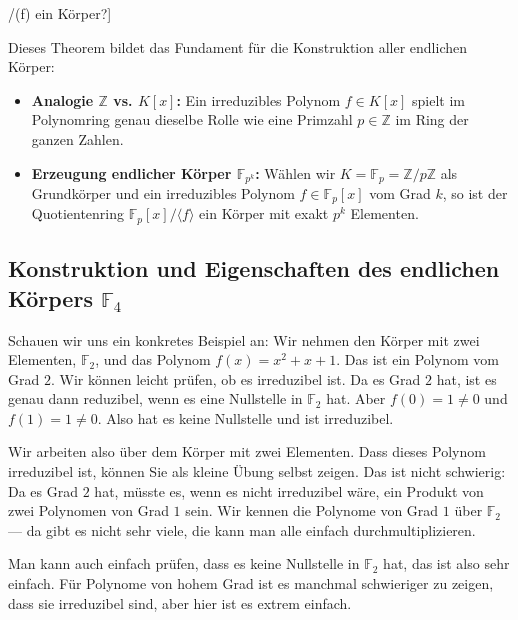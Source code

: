 \begin{math-stroke}[Wann ist K[x]/(f) ein Körper?]
\begin{explanation-of-steps}
Dieses Theorem bildet das Fundament für die Konstruktion aller endlichen Körper:
\begin{itemize}
    \item \textbf{Analogie $\mathbb{Z}$ vs. $K[x]$:} Ein irreduzibles Polynom $f \in K[x]$ spielt im Polynomring genau dieselbe Rolle wie eine Primzahl $p \in \mathbb{Z}$ im Ring der ganzen Zahlen.
    \item \textbf{Erzeugung endlicher Körper $\mathbb{F}_{p^k}$:} Wählen wir $K = \mathbb{F}_p = \mathbb{Z}/p\mathbb{Z}$ als Grundkörper und ein irreduzibles Polynom $f \in \mathbb{F}_p[x]$ vom Grad $k$, so ist der Quotientenring $\mathbb{F}_p[x]/\langle f \rangle$ ein Körper mit exakt $p^k$ Elementen.
\end{itemize}
\end{explanation-of-steps}
\end{math-stroke}

\begin{ai-global-state-checkpoint-invisible-content}
\end{ai-global-state-checkpoint-invisible-content}

\subsection{Konstruktion und Eigenschaften des endlichen Körpers \texorpdfstring{$\mathbb{F}_4$}{F4}}

\begin{spoken-clean}[00:57:19 - 00:58:57]
Schauen wir uns ein konkretes Beispiel an: Wir nehmen den Körper mit zwei Elementen, $\mathbb{F}_2$, und das Polynom $f(x) = x^2 + x + 1$. Das ist ein Polynom vom Grad $2$. Wir können leicht prüfen, ob es irreduzibel ist. Da es Grad $2$ hat, ist es genau dann reduzibel, wenn es eine Nullstelle in $\mathbb{F}_2$ hat. Aber $f(0) = 1 \neq 0$ und $f(1) = 1 \neq 0$. Also hat es keine Nullstelle und ist irreduzibel.

Wir arbeiten also über dem Körper mit zwei Elementen. Dass dieses Polynom irreduzibel ist, können Sie als kleine Übung selbst zeigen. Das ist nicht schwierig: Da es Grad $2$ hat, müsste es, wenn es nicht irreduzibel wäre, ein Produkt von zwei Polynomen von Grad $1$ sein. Wir kennen die Polynome von Grad $1$ über $\mathbb{F}_2$ --- da gibt es nicht sehr viele, die kann man alle einfach durchmultiplizieren.

Man kann auch einfach prüfen, dass es keine Nullstelle in $\mathbb{F}_2$ hat, das ist also sehr einfach. Für Polynome von hohem Grad ist es manchmal schwieriger zu zeigen, dass sie irreduzibel sind, aber hier ist es extrem einfach.
\end{spoken-clean}

